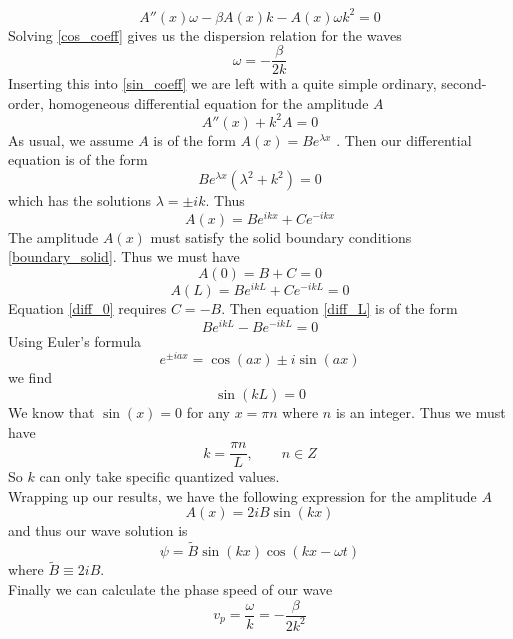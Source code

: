 \documentclass[12pt]{article}
\numberwithin{figure}{section}
\numberwithin{table}{section}
\begin{document}
\begin{equation}
\label{sin_coeff}
A''(x)\omega-\beta A(x)k-A(x)\omega k^2 = 0
\end{equation}
Solving \eqref{cos_coeff} gives us the dispersion relation for the waves
\begin{equation}
\label{eq:disp_rel}
\omega = -\frac{\beta}{2k}
\end{equation}
Inserting this into \eqref{sin_coeff} we are left with a quite simple ordinary, second-order, homogeneous differential equation for the amplitude $A$
\begin{equation}
\label{A_diffeq}
A''(x)+k^2A=0
\end{equation}
As usual, we assume $A$ is of the form $A(x)=Be^{\lambda x}$ \cite{MathMethods}. Then our differential equation is of the form
\begin{equation}
Be^{\lambda x}(\lambda^2+k^2)=0
\end{equation}
which has the solutions $\lambda = \pm ik$. Thus
\begin{equation}
\label{A_sol}
A(x) = Be^{ikx}+Ce^{-ikx}
\end{equation}
The amplitude $A(x)$ must satisfy the solid boundary conditions \eqref{boundary_solid}. Thus we must have
\begin{equation}
\label{diff_0}
A(0) = B+C = 0
\end{equation}
\begin{equation}
\label{diff_L}
A(L) = Be^{ikL}+Ce^{-ikL}=0
\end{equation}
Equation \eqref{diff_0} requires $C=-B$. Then equation \eqref{diff_L} is of the form
\begin{equation}
Be^{ikL}-Be^{-ikL}=0
\end{equation}
Using Euler's formula \cite{MathMethods}
\begin{equation}
e^{\pm iax}=\cos(ax)\pm i\sin(ax) 
\end{equation}
we find
\begin{equation}
\sin(kL)=0
\end{equation}
We know that $\sin(x)=0$ for any $x=\pi n$ where $n$ is an integer. Thus we must have 
\begin{equation}
\label{k_quantized}
k = \frac{\pi n}{L}, \qquad n\in Z
\end{equation}
So $k$ can only take specific quantized values. \\
\noindent Wrapping up our results, we have the following expression for the amplitude $A$
\begin{equation}
\label{A_final}
A(x)=2iB\sin(kx)
\end{equation}
and thus our wave solution is 
\begin{equation}
\label{wave_final}
\psi = \tilde{B}\sin(kx)\cos(kx-\omega t)
\end{equation}
where $\tilde{B}\equiv 2iB$.\\
\noindent Finally we can calculate the phase speed of our wave
\begin{equation}
\label{phase_speed_solid}
v_p=\frac{\omega}{k}=-\frac{\beta}{2k^2}
\end{equation}
\end{document}
